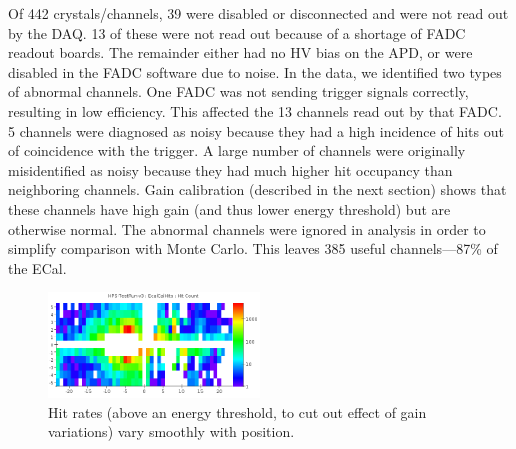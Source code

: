 
\vspace{1cm}{\bf ECal performance}


Of 442 crystals/channels, 39 were disabled or disconnected and were not read out by the DAQ. 
13 of these were not read out because of a shortage of FADC readout boards.
The remainder either had no HV bias on the APD, or were disabled in the FADC software due to noise.
In the data, we identified two types of abnormal channels. 
One FADC was not sending trigger signals correctly, resulting in low efficiency. This affected the 13 channels read out by that FADC.
5 channels were diagnosed as noisy because they had a high incidence of hits out of coincidence with the trigger.
A large number of channels were originally misidentified as noisy because they had much higher hit occupancy than neighboring channels.
Gain calibration (described in the next section) shows that these channels have high gain (and thus lower energy threshold) but are otherwise normal.
The abnormal channels were ignored in analysis in order to simplify comparison with Monte Carlo. This leaves 385 useful channels---87\% of the ECal.


\begin{figure}[ht]
	\includegraphics[width=0.5\textwidth]{test2012/ecalperformance/hitrates}
	\caption{\small{Hit rates (above an energy threshold, to cut out effect of gain variations) vary smoothly with position.}}
	\label{fig:hitrates}
\end{figure}


